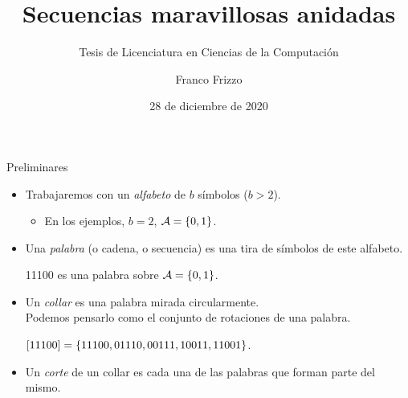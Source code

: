 \documentclass[spanish,xcolor={table}]{beamer}
\title{Secuencias maravillosas anidadas}
\subtitle{Tesis de Licenciatura en Ciencias de la Computación}
\author{Franco Frizzo}
\institute[DC, FCEyN, UBA]
    {Departamento de Computación, FCEyN, UBA}
\date{28 de diciembre de 2020}
\begin{document}
\frame{\titlepage}


\begin{frame}{Preliminares}

\begin{itemize}
  \item Trabajaremos con un \emph{alfabeto} de $b$ símbolos ($b > 2$).
  \begin{itemize}
    \item En los ejemplos, $b = 2$, $\mathcal{A} = \lbrace 0, 1 \rbrace$.
  \end{itemize}

  \item Una \emph{palabra} (o cadena, o secuencia) es una tira de símbolos de este alfabeto.
  
  \begin{example}
    11100 es una palabra sobre $\mathcal{A} = \lbrace 0, 1 \rbrace$.
  \end{example}
  
  \item Un \emph{collar} es una palabra mirada circularmente. \\
  Podemos pensarlo como el conjunto de rotaciones de una palabra.

  \begin{example}
    $\left[11100\right] = \lbrace 11100, 01110, 00111, 10011, 11001 \rbrace$.
  \end{example}
  
  \item Un \emph{corte} de un collar es cada una de las palabras que forman
  parte del mismo.
\end{itemize}

\end{frame}

\end{document}
